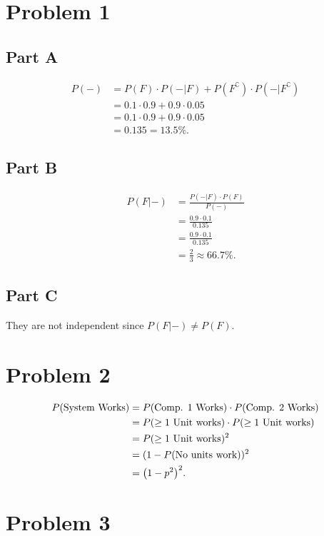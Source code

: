 \documentclass[12pt]{extarticle}
\begin{document}
\section*{Problem 1}
\subsection*{Part A}
	\begin{align*}
	P(-) &= P(F) \cdot P(- | F) + P(F^\complement) \cdot P(- | F^\complement) \\
	&= 0.1 \cdot 0.9 + 0.9 \cdot 0.05 \\
	&= 0.1 \cdot 0.9 + 0.9 \cdot 0.05 \\
	&= 0.135 = 13.5\%
.\end{align*}

\subsection*{Part B}
\begin{align*}
	P(F | -) &= \frac{P(- | F) \cdot P(F)}{P(-)} \\
					 &= \frac{0.9 \cdot 0.1}{0.135} \\
					 &= \frac{0.9 \cdot 0.1}{0.135} \\
					 &= \frac{2}{3} \approx 66.7\%
.\end{align*}

\subsection*{Part C}
They are not independent since $P(F | -) \neq P(F)$.

\section*{Problem 2}
\begin{align*}
	P(\text{System Works}) &= P(\text{Comp. 1 Works}) \cdot P(\text{Comp. 2 Works}) \\
												 &= P(\geq 1 \text{ Unit works}) \cdot P(\geq 1 \text{ Unit works}) \\
												 &= P(\geq 1 \text{ Unit works})^2 \\
												 &= (1 - P(\text{No units work}))^2 \\
												 &= \qty(1 - p^2)^2
.\end{align*}

\section*{Problem 3}
\end{document}

